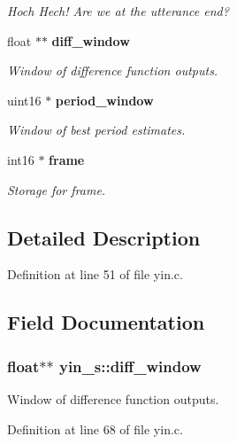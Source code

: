 \begin{DoxyCompactItemize}
\begin{DoxyCompactList}\small\item\em Hoch Hech! Are we at the utterance end? \end{DoxyCompactList}\item 
float $\ast$$\ast$ {\bf diff\-\_\-window}
\begin{DoxyCompactList}\small\item\em Window of difference function outputs. \end{DoxyCompactList}\item 
uint16 $\ast$ {\bf period\-\_\-window}
\begin{DoxyCompactList}\small\item\em Window of best period estimates. \end{DoxyCompactList}\item 
int16 $\ast$ {\bf frame}\label{structyin__s_adb8a1fa6168286b87244f35361a64926}

\begin{DoxyCompactList}\small\item\em Storage for frame. \end{DoxyCompactList}\end{DoxyCompactItemize}


\subsection{Detailed Description}


Definition at line 51 of file yin.\-c.



\subsection{Field Documentation}
\subsubsection[{diff\-\_\-window}]{\setlength{\rightskip}{0pt plus 5cm}float$\ast$$\ast$ yin\-\_\-s\-::diff\-\_\-window}\label{structyin__s_a41981e290a7b03ae2dae834d4b6bf930}


Window of difference function outputs. 



Definition at line 68 of file yin.\-c.



